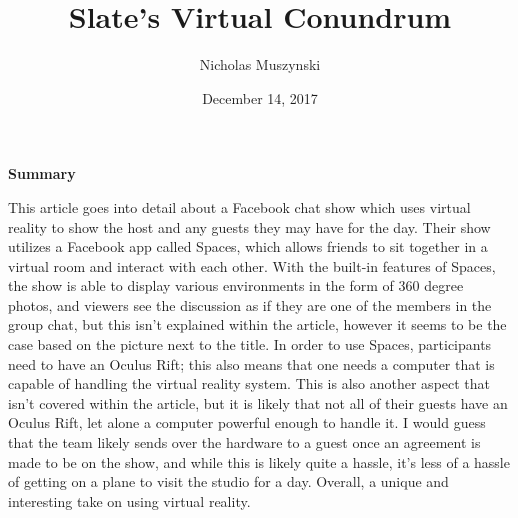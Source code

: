 \documentclass{article}
\begin{document}
\title{Slate's Virtual Conundrum}
\author{Nicholas Muszynski}
\date{December 14, 2017}

\maketitle

\textbf{Summary}
\newline

This article goes into detail about a Facebook chat show which uses virtual reality to show the host and any guests they may have for the day. Their show utilizes a Facebook app called Spaces, which allows friends to sit together in a virtual room and interact with each other. With the built-in features of Spaces, the show is able to display various environments in the form of 360 degree photos, and viewers see the discussion as if they are one of the members in the group chat, but this isn't explained within the article, however it seems to be the case based on the picture next to the title. In order to use Spaces, participants need to have an Oculus Rift; this also means that one needs a computer that is capable of handling the virtual reality system. This is also another aspect that isn't covered within the article, but it is likely that not all of their guests have an Oculus Rift, let alone a computer powerful enough to handle it. I would guess that the team likely sends over the hardware to a guest once an agreement is made to be on the show, and while this is likely quite a hassle, it's less of a hassle of getting on a plane to visit the studio for a day. Overall, a unique and interesting take on using virtual reality.

\nocite{conundrumCite}



\end{document}
